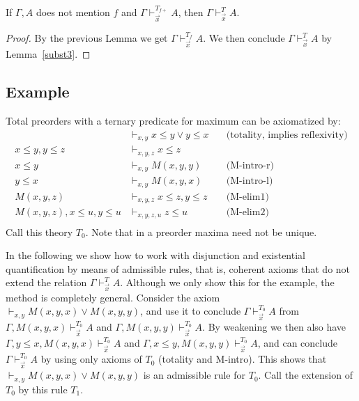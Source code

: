 \documentclass{fundam}
\begin{document}
\begin{theorem}\label{thm:skolem}
If $\Gamma,A$ does not mention $f$ and $\Gamma\vdash_{\vec{x}}^{T_{f{+}}} A$, then
$\Gamma\vdash_{\vec{x}}^T A$.
\end{theorem}

\begin{proof}
By the previous Lemma we get $\Gamma\vdash_{\vec{x}}^{T_f} A$. We then conclude
$\Gamma\vdash_{\vec{x}}^T A$ by Lemma~\ref{subst3}.
\end{proof}

\subsection{Example}

Total preorders with a ternary predicate for maximum can be axiomatized by:
\begin{align*}
                                                 &\vdash_{x,y}           x\leq y \lor y\leq x
&\quad\text{(totality, implies reflexivity)}\\
x\leq y, y\leq z              &\vdash_{x,y,z}        x\leq z\\
x\leq y                   &\vdash_{x,y}           M(x,y,y)
&\quad\text{(M-intro-r)}\\ 
y \leq x                                    &\vdash_{x,y}           M(x,y,x)
&\quad\text{(M-intro-l)}\\
M(x,y,z)                                   &\vdash_{x,y,z}        x\leq z,  y\leq z
&\quad\text{(M-elim1)}\\
M(x,y,z), x\leq u,  y\leq u      &\vdash_{x,y,z,u}    z\leq u
&\quad\text{(M-elim2)}\\
\end{align*}
Call this theory $T_0$. Note that in a preorder maxima need not be unique.

In the following we show how to work with disjunction and existential
quantification by means of admissible rules, that is, coherent
axioms that do not extend the relation $\Gamma\vdash_{\vec{x}}^T A$. 
Although we only show this for the example, the method is completely general.
Consider the axiom $\vdash_{x,y} M(x,y,x)  \lor M(x,y,y)$, and use
it to conclude $\Gamma\vdash_{\vec{x}}^{T_0} A$ from 
$\Gamma, M(x,y,x) \vdash_{\vec{x}}^{T_0} A$ and
$\Gamma, M(x,y,y) \vdash_{\vec{x}}^{T_0} A$. 
By weakening we then also have
$\Gamma, y\leq x, M(x,y,x)\vdash_{\vec{x}}^{T_0} A$ and
$\Gamma, x\leq y, M(x,y,y)\vdash_{\vec{x}}^{T_0} A$,
and can conclude $\Gamma\vdash_{\vec{x}}^{T_0} A$
by using only axioms of $T_0$ (totality and M-intro).
This shows that $\vdash_{x,y} M(x,y,x)  \lor M(x,y,y)$ is an
admissible rule for $T_0$. Call the extension of $T_0$ by this rule $T_1$.
\end{document}
